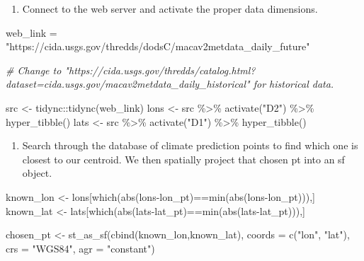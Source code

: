\documentclass[
  paper=a4,
  ,captions=tableheading
]{scrartcl}
\newenvironment{Shaded}{\begin{snugshade}}{\end{snugshade}}
\newcommand{\AttributeTok}[1]{\textcolor[rgb]{0.77,0.63,0.00}{#1}}
\newcommand{\CommentTok}[1]{\textcolor[rgb]{0.56,0.35,0.01}{\textit{#1}}}
\newcommand{\FunctionTok}[1]{\textcolor[rgb]{0.00,0.00,0.00}{#1}}
\newcommand{\NormalTok}[1]{#1}
\newcommand{\OtherTok}[1]{\textcolor[rgb]{0.56,0.35,0.01}{#1}}
\newcommand{\SpecialCharTok}[1]{\textcolor[rgb]{0.00,0.00,0.00}{#1}}
\newcommand{\StringTok}[1]{\textcolor[rgb]{0.31,0.60,0.02}{#1}}
\providecommand{\tightlist}{%
  \setlength{\itemsep}{0pt}\setlength{\parskip}{0pt}}
\begin{document}
\begin{enumerate}
\def\labelenumi{\arabic{enumi}.}
\setcounter{enumi}{1}
\tightlist
\item
  Connect to the web server and activate the proper data dimensions.
\end{enumerate}

\begin{Shaded}
\begin{Highlighting}[]
\NormalTok{web\_link }\OtherTok{=} \StringTok{"https://cida.usgs.gov/thredds/dodsC/macav2metdata\_daily\_future"}

\CommentTok{\# Change to "https://cida.usgs.gov/thredds/catalog.html?dataset=cida.usgs.gov/macav2metdata\_daily\_historical" for historical data. }

\NormalTok{src }\OtherTok{\textless{}{-}}\NormalTok{ tidync}\SpecialCharTok{::}\FunctionTok{tidync}\NormalTok{(web\_link)}
\NormalTok{lons }\OtherTok{\textless{}{-}}\NormalTok{ src }\SpecialCharTok{\%\textgreater{}\%} \FunctionTok{activate}\NormalTok{(}\StringTok{"D2"}\NormalTok{) }\SpecialCharTok{\%\textgreater{}\%} \FunctionTok{hyper\_tibble}\NormalTok{()}
\NormalTok{lats }\OtherTok{\textless{}{-}}\NormalTok{ src }\SpecialCharTok{\%\textgreater{}\%} \FunctionTok{activate}\NormalTok{(}\StringTok{"D1"}\NormalTok{) }\SpecialCharTok{\%\textgreater{}\%} \FunctionTok{hyper\_tibble}\NormalTok{()}
\end{Highlighting}
\end{Shaded}

\begin{enumerate}
\def\labelenumi{\arabic{enumi}.}
\setcounter{enumi}{2}
\tightlist
\item
  Search through the database of climate prediction points to find which
  one is closest to our centroid. We then spatially project that chosen
  pt into an sf object.
\end{enumerate}

\begin{Shaded}
\begin{Highlighting}[]
\NormalTok{known\_lon }\OtherTok{\textless{}{-}}\NormalTok{ lons[}\FunctionTok{which}\NormalTok{(}\FunctionTok{abs}\NormalTok{(lons}\SpecialCharTok{{-}}\NormalTok{lon\_pt)}\SpecialCharTok{==}\FunctionTok{min}\NormalTok{(}\FunctionTok{abs}\NormalTok{(lons}\SpecialCharTok{{-}}\NormalTok{lon\_pt))),]}
\NormalTok{known\_lat }\OtherTok{\textless{}{-}}\NormalTok{ lats[}\FunctionTok{which}\NormalTok{(}\FunctionTok{abs}\NormalTok{(lats}\SpecialCharTok{{-}}\NormalTok{lat\_pt)}\SpecialCharTok{==}\FunctionTok{min}\NormalTok{(}\FunctionTok{abs}\NormalTok{(lats}\SpecialCharTok{{-}}\NormalTok{lat\_pt))),]}

\NormalTok{chosen\_pt }\OtherTok{\textless{}{-}} \FunctionTok{st\_as\_sf}\NormalTok{(}\FunctionTok{cbind}\NormalTok{(known\_lon,known\_lat), }\AttributeTok{coords =} \FunctionTok{c}\NormalTok{(}\StringTok{"lon"}\NormalTok{, }\StringTok{"lat"}\NormalTok{), }\AttributeTok{crs =} \StringTok{"WGS84"}\NormalTok{, }\AttributeTok{agr =} \StringTok{"constant"}\NormalTok{)}
\end{Highlighting}
\end{Shaded}
\end{document}
